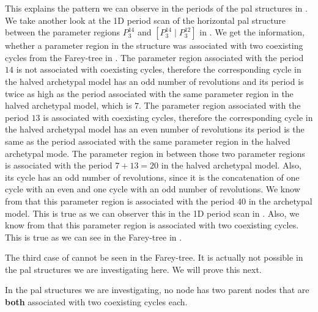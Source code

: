 This explains the pattern we can observe in the periods of the \gls{pal} structures in .
We take another look at the 1D period scan of the horizontal \gls{pal} structure between the parameter regions $P^{14}_3$ and $\left[P^{14}_3  \mid P^{12}_3\right]$ in .
We get the information, whether a parameter region in the structure was associated with two coexisting cycles from the Farey-tree in .
The parameter region associated with the period $14$ is not associated with coexisting cycles, therefore the corresponding cycle in the halved archetypal model has an odd number of revolutions and its period is twice as high as the period associated with the same parameter region in the halved archetypal model, which is $7$.
The parameter region associated with the period $13$ is associated with coexisting cycles, therefore the corresponding cycle in the halved archetypal model has an even number of revolutions its period is the same as the period associated with the same parameter region in the halved archetypal mode.
The parameter region in between those two parameter regions is associated with the period $7 + 13 = 20$ in the halved archetypal model.
Also, its cycle has an odd number of revolutions, since it is the concatenation of one cycle with an even and one cycle with an odd number of revolutions.
We know from  that this parameter region is associated with the period $40$ in the archetypal model.
This is true as we can observer this in the 1D period scan in .
Also, we know from  that this parameter region is associated with two coexisting cycles.
This is true as we can see in the Farey-tree in .

The third case of  cannot be seen in the Farey-tree.
It is actually not possible in the \gls{pal} structures we are investigating here.
We will prove this next.

\begin{theorem}
	\label{theorem:no.parent.coex}
	In the \gls{pal} structures we are investigating, no node has two parent nodes that are \textbf{both} associated with two coexisting cycles each.
\end{theorem}

